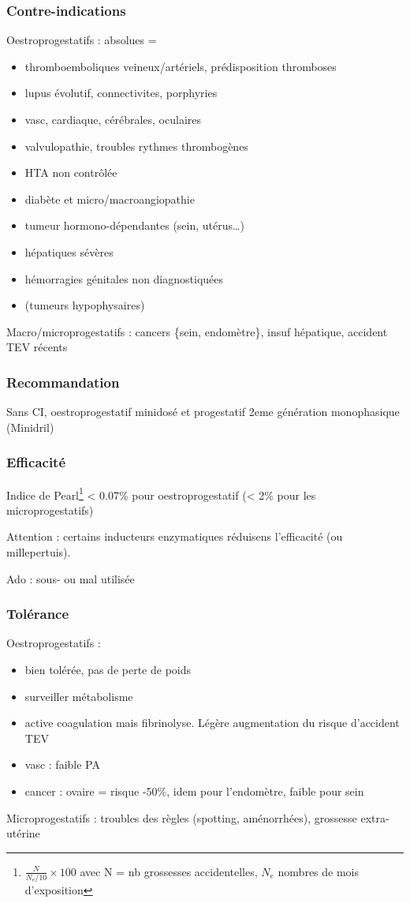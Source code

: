 \documentclass[11pt]{article}
\begin{document}
\subsubsection{Contre-indications}
\label{sec:orgf3c36c7}
Oestroprogestatifs : absolues =
\begin{itemize}
\item thromboemboliques veineux/artériels, prédisposition thromboses
\item lupus évolutif, connectivites, porphyries
\item vasc, cardiaque, cérébrales, oculaires
\item valvulopathie, troubles rythmes thrombogènes
\item HTA non contrôlée
\item diabète et micro/macroangiopathie
\item tumeur hormono-dépendantes (sein, utérus\ldots{})
\item hépatiques sévères
\item hémorragies génitales non diagnostiquées
\item (tumeurs hypophysaires)
\end{itemize}
Macro/microprogestatifs : cancers \{sein, endomètre\}, insuf hépatique, accident
TEV récents

\subsubsection{Recommandation}
\label{sec:orgea9844a}
Sans CI, oestroprogestatif minidosé et progestatif 2eme génération monophasique
(Minidril)

\subsubsection{Efficacité}
\label{sec:org1f9afa6}
Indice de Pearl\footnote{\(\frac{N}{N_e/10}\times 100\) avec N = nb grossesses
accidentelles, \(N_e\) nombres de mois d'exposition} < 0.07\% pour oestroprogestatif
(< 2\% pour les microprogestatifs)

Attention : certains inducteurs enzymatiques réduisens l'efficacité (ou
millepertuis).

Ado : sous- ou mal utilisée

\subsubsection{Tolérance}
\label{sec:org570eec7}
Oestroprogestatifs :
\begin{itemize}
\item bien tolérée, pas de perte de poids
\item surveiller métabolisme
\item active coagulation mais \inc fibrinolyse. Légère augmentation du risque
d'accident TEV
\item vasc : faible \inc PA
\item cancer : ovaire = risque -50\%, idem pour l'endomètre, faible \inc pour sein
\end{itemize}
Microprogestatifs : troubles des règles (spotting, aménorrhées), grossesse
extra-utérine
\end{document}
